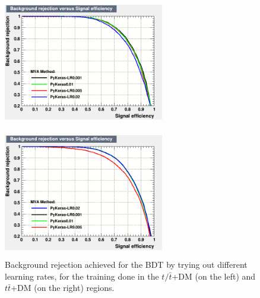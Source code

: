 \documentclass[a4paper, 10pt, openright]{report}
\begin{document}
\begin{appendices}

\begin{figure}[htbp]
\centering
\begin{minipage}[b]{.48\textwidth}
\includegraphics[width=7cm, height=5.7cm]{figs/ANN_LR_ST.png}
\end{minipage}\hfill
\begin{minipage}[b]{.48\textwidth}
\includegraphics[width=7cm, height=5.7cm]{figs/ANN_LR_TTbar.png}
\end{minipage} \hfill
\caption{Background rejection achieved for the \ac{BDT} by trying out different learning rates, for the training done in the $t/ \bar t$+DM (on the left) and $t \bar t$+DM (on the right) regions.}
\label{fig:optLearning}
\end{figure}


\end{appendices}
\end{document}
